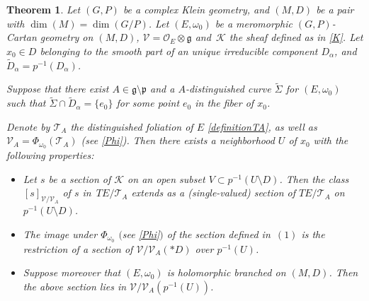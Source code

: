 \documentclass[10pt,a4paper]{amsart}
\numberwithin{equation}{section}
\newtheorem{Theorem}{Theorem}[section]
\begin{document}
\begin{Theorem}\label{Lie-Cartan} Let $(G,P)$ be a complex Klein geometry, and $(M,D)$ be a pair with $\dim(M)=\dim(G/P)$. Let $(E,\omega_0)$ be a meromorphic $(G,P)$-Cartan geometry on $(M,D)$, $\mathcal{V}=\mathcal{O}_E\otimes \mathfrak{g}$ and~$\mathcal{K}$ the sheaf defined as in \eqref{K}. Let $x_0 \in D$ belonging to the smooth part of an unique irreducible component $D_\alpha$, and $\tilde{D}_\alpha = p^{-1}(D_\alpha)$.

Suppose that there exist $A\in \mathfrak{g}\setminus \mathfrak{p}$ and a $A$-distinguished curve $\tilde{\Sigma}$ for $(E,\omega_0)$ such that $\tilde{\Sigma}\cap \tilde{D}_\alpha= \{e_0\}$ for some point $e_0$ in the fiber of $x_0$.

Denote by $\mathcal{T}_A$ the distinguished foliation of $E$ \eqref{definitionTA}, as well as $\mathcal{V}_A=\Phi_{\omega_0}(\mathcal{T}_A)$ \textup{(}see \eqref{Phi}{\rm )}. Then there exists a neighborhood $U$ of $x_0$ with the following properties:
 \begin{itemize}\itemsep=0pt
 \item[$(1)$] Let $s$ be a section of $\mathcal{K}$ on an open subset $V\subset p^{-1}(U\setminus D)$. Then the class $[s]_{\mathcal{V}/\mathcal{V}_A}$ of $s$ in~$TE/\mathcal{T}_A$ extends as a (single-valued) section of $TE/\mathcal{T}_A$ on $p^{-1}(U\setminus D)$.
 \item[$(2)$] The image under $\Phi_{\omega_0}$ $($see \eqref{Phi}$)$ of the section defined in~$(1)$ is the restriction of a section of $\mathcal{V}/\mathcal{V}_A(* D)$ over $p^{-1}(U)$.
\item[$(3)$] Suppose moreover that $(E,\omega_0)$ is holomorphic branched on $(M,D)$. Then the above section lies in $\mathcal{V}/\mathcal{V}_A(p^{-1}(U))$. \end{itemize}
\end{Theorem}
\end{document}
